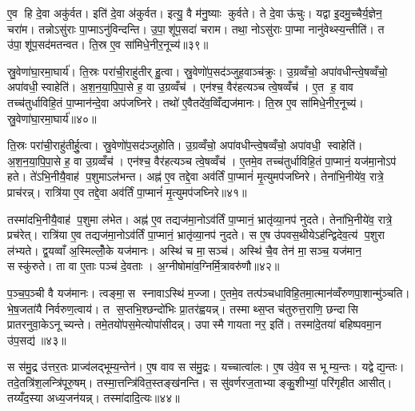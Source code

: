 ए॒व हि दे॒वा अकु॑र्वत। इति॑ दे॒वा अ॑कुर्वत। इत्यु॒ वै म॑नु॒ष्याः कुर्वते। ते दे॒वा ऊ॑चुः। यद्वा इ॒दमु॒च्चैर्य॒ज्ञेन॒ चरा॑म। तन्नोऽसु॑राः पा॒प्माऽनु॑विन्दन्ति। उ॒पा॒शू॑प॒सदा॑ चराम। तथा॒ नोऽसु॑राः पा॒प्मा नानु॑वेथ्स्य॒न्तीति॑। त उ॑पा॒शू॑प॒सद॑मतन्वत। ति॒स्र ए॒व सा॑मिधे॒नीर॒नूच्य॑॥३९॥

स्रु॒वेणा॑घा॒रमा॒घार्य॑। ति॒स्रः परा॑ची॒राहु॑तीर् हु॒त्वा। स्रु॒वेणो॑प॒सद॑ञ्जुह॒वाञ्च॑क्रुः। उ॒ग्रव्वँचो॒ अपा॑वधीन्त्वे॒षव्वँचो॒ अपा॑वधी॒स्वाहेति॑। अ॒श॒न॒या॒पि॒पा॒से ह॒ वा उ॒ग्रव्वँच॑। एन॑श्च॒ वैर॑हत्यञ्च त्वे॒षव्वँच॑। ए॒त ह॒ वाव तच्च॑तुर्धाविहि॒तं पा॒प्मान॑न्दे॒वा अप॑जघ्निरे। तथो॑ ए॒वैतदे॑व॒व्विँद्यज॑मानः। ति॒स्र ए॒व सा॑मिधे॒नीर॒नूच्य॑। स्रु॒वेणा॑घा॒रमा॒घार्य॑॥४०॥

ति॒स्रः परा॑ची॒राहु॑तीर्\mbox{}हु॒त्वा। स्रु॒वेणो॑प॒सद॑ञ्जुहोति। उ॒ग्रव्वँचो॒ अपा॑वधीन्त्वे॒षव्वँचो॒ अपा॑वधी॒ स्वाहेति॑। अ॒श॒न॒या॒पि॒पा॒से ह॒ वा उ॒ग्रव्वँच॑। एन॑श्च॒ वैर॑हत्यञ्च त्वे॒षव्वँच॑। ए॒तमे॒व तच्च॑तुर्धाविहि॒तं पा॒प्मानं॒ यज॑मा॒नोऽप॑ हते। ते॑ऽभि॒नीयै॒वाह॑ प॒शुमाऽल॑भन्त। अह्न॑ ए॒व तद्दे॒वा अव॑र्तिं पा॒प्मानं॑ मृ॒त्युमप॑जघ्निरे। तेना॑भि॒नीये॑व॒ रात्रे॒ प्राच॑रन्न्। रात्रि॑या ए॒व तद्दे॒वा अव॑र्तिं पा॒प्मानं॑ मृ॒त्युमप॑जघ्निरे॥४१॥

तस्मा॑दभि॒नीयै॒वाह॑ प॒शुमा ल॑भेत। अह्न॑ ए॒व तद्यज॑मा॒नोऽव॑र्तिं पा॒प्मानं॒ भ्रातृ॑व्या॒नप॑ नुदते। तेना॑भि॒नीये॑व॒ रात्रे॒ प्रच॑रेत्। रात्रि॑या ए॒व तद्यज॑मा॒नोऽव॑र्तिं पा॒प्मानं॒ भ्रातृ॑व्या॒नप॑ नुदते। स ए॒ष उ॑पवस॒थीयेऽह॑न्द्विदेव॒त्य॑ प॒शुरा ल॑भ्यते। द्व॒यव्वाँ अ॒स्मिल्लोँ॒के यज॑मानः। अस्थि॑ च मा॒सञ्च॑। अस्थि॑ चै॒व तेन॑ मा॒सञ्च॒ यज॑मान॒ सस्कु॑रुते। ता वा ए॒ताः पञ्च॑ दे॒वताः। अ॒ग्नीषोमा॑व॒ग्निर्मि॒त्रावरु॑णौ॥४२॥

प॒ञ्च॒प॒ञ्ची वै यज॑मानः। त्वङ्मा॒स स्नावाऽस्थि॑ म॒ज्जा। ए॒तमे॒व तत्प॑ञ्चधाविहि॒तमा॒त्मान॑व्वँरुणपा॒शान्मु॑ञ्चति। भे॒ष॒जता॑यै निर्वरुण॒त्वाय॑। त स॒प्तभि॒श्छन्दो॑भिः प्रा॒तर॑ह्वयन्न्। तस्माथ्स॒प्त च॑तुरुत्त॒राणि॒ छन्दासि प्रातरनुवा॒केऽनूच्यन्ते। तमे॒तयो॑पस॒मेत्योपा॑सीदन्न्। उपास्मै गायता नर॒ इति॑। तस्मा॑दे॒तया॑ बहिष्पवमा॒न उ॑प॒सद्य॑॥४३॥\anuvakamend[ऐ॒च्छ॒न्न॒न॒य॒स्ति॒ष्ठ॒न्ते॒ऽनूच्या॒नूच्य॑ स्रु॒वेणा॑घा॒रमा॒घार्य॒ रात्रि॑या ए॒व तद्दे॒वा अव॑र्तिं पा॒प्मानं॑ मृ॒त्युमप॑जिघ्निरे मि॒त्रावरु॑णौ॒ नव॑ च (दे॒वा यज॑मानो दे॒वा दे॒वा यज॑मानो॒ यज॑मानोऽलभन्त॒ प्राच॑रल्लँभेत॒ प्रच॑रे॒दाल॑भ॒न्ताल॑भेत मृ॒त्युमप॑जघ्निरे॒ भ्रातृ॑व्यान्॥)]

स स॑मु॒द्र उ॑त्तर॒तः प्राज्व॑लद्भूम्य॒न्तेन॑। ए॒ष वाव स स॑मु॒द्रः। यच्चात्वा॑लः। ए॒ष उ॑वे॒व स भूम्य॒न्तः। यद्वेद्य॒न्तः। तदे॒तत्रि॑श॒लन्त्रि॑पूरु॒षम्। तस्मा॒त्तन्त्रि॑वित॒स्तङ्ख॑नन्ति। स सु॑वर्णरज॒ताभ्याङ्कु॒शीभ्यां॒ परि॑गृहीत आसीत्। तय्यँद॒स्या अध्य॒जन॑यन्न्। तस्मा॑दादि॒त्यः॥४४॥

